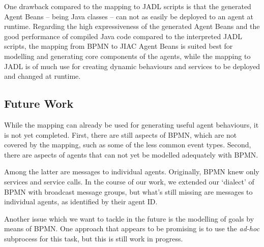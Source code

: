 One drawback compared to the mapping to JADL scripts is that the generated Agent
Beans -- being Java classes -- can not as easily be deployed to an agent at runtime.
Regarding the high expressiveness of the generated Agent Beans and the good
performance of compiled Java code compared to the interpreted JADL scripts, the
mapping from BPMN to JIAC Agent Beans is suited best for modelling and generating
core components of the agents, while the mapping to JADL is of much use for
creating dynamic behaviours and services to be deployed and changed at runtime.



\subsection{Future Work}

While the mapping can already be used for generating useful agent behaviours,
it is not yet completed.  First, there are still aspects of BPMN, which are not
covered by the mapping, such as some of the less common event types.  Second,
there are aspects of agents that can not yet be modelled adequately with BPMN.

Among the latter are messages to individual agents.  Originally, BPMN knew only
services and service calls.  In the course of our work, we extended our `dialect'
of BPMN with broadcast message groups, but what's still missing are messages to
individual agents, as identified by their agent ID.

Another issue which we want to tackle in the future is the modelling of goals by
means of BPMN.  One approach that appears to be promising is to use the
\emph{ad-hoc} subprocess for this task, but this is still work in progress.

